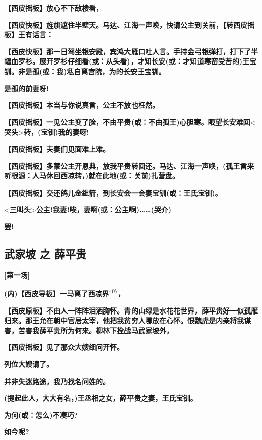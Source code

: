 \textbf{【西皮摇板】放心不下敌楼看，}

\textbf{【西皮快板】旌旗遮住半壁天。马达、江海一声唤，快请公主到关前，【转西皮摇板】王有话言：}

\textbf{【西皮快板】那一日驾坐银安殿，宾鸿大雁口吐人言。手持金弓银弹打，打下了半幅血罗衫。展开罗衫仔细看(或：从头看)，才知长安(或：才知道寒窑受苦的)王宝钏。非是孤(或：我)私自离宫院，为的长安王宝钏。}

\textbf{是孤的前妻呀!}

\textbf{【西皮摇板】本当与你说真言，公主不放也枉然。}

\textbf{【西皮摇板】一见公主变了脸，不由平贵(或：不由孤王)心胆寒。眼望长安难回}\textless{}\textbf{哭头}\textgreater{}\textbf{转，(宝钏)我的妻呀!}

\textbf{【西皮摇板】夫妻们见面难上难。}

\textbf{【西皮摇板】多蒙公主开恩典，放我平贵转回还。马达、江海一声唤，(孤王言来听根源：人马休回西凉转，)就在此地(或：关前)扎营盘。}

\textbf{【西皮摇板】交还鸽儿金鈚箭，到长安会一会妻宝钏(或：王氏宝钏)。}

\textless{}\textbf{三叫头}\textgreater{}\textbf{公主!我妻!唉，妻啊(或：公主啊)\ldots{}\ldots{}(哭介)}

\textbf{罢!}

\newpage
\hypertarget{ux6b66ux5bb6ux5761-ux4e4b-ux859bux5e73ux8d35}{%
\subsection{武家坡 之
薛平贵}\label{ux6b66ux5bb6ux5761-ux4e4b-ux859bux5e73ux8d35}}

\textbf{{[}第一场{]}}

\textbf{(内)【西皮导板】一马离了西凉界}\protect\hyperlink{fn407}{\textsuperscript{407}}\textbf{，}

\textbf{【西皮原板】不由人一阵阵泪洒胸怀。青的山绿是水花花世界，薛平贵好一似孤雁归来。那王允在朝中官居太宰，他把我贫穷人哪放在心怀。恨魏虎是内亲将我谋害，苦害我薛平贵所为何来。柳林下拴战马武家坡外，}

\textbf{【西皮摇板】见了那众大嫂细问开怀。}

\textbf{列位大嫂请了。}

\textbf{并非失迷路途，我乃找名问姓的。}

\textbf{(提起此人，大大有名，)王丞相之女，薛平贵之妻，王氏宝钏。}

\textbf{为何(或：怎么)不凑巧?}

\textbf{如今呢?}

